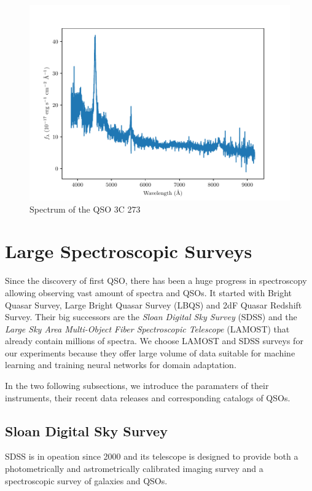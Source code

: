 \begin{figure}
\includegraphics[width=\textwidth]{img/spec_3c_273.pdf}
\caption{Spectrum of the QSO 3C 273}
\label{3c_273_spectrum}
\end{figure}

\section{Large Spectroscopic Surveys}
\label{large_spec_surveys}

Since the discovery of first QSO,
there has been a huge progress in spectroscopy allowing observing
vast amount of spectra and QSOs.
It started with Bright Quasar Survey, Large Bright Quasar Survey (LBQS)
and 2dF Quasar Redshift Survey.
Their big successors are the \textit{Sloan Digital Sky Survey} (SDSS)
and the \textit{Large Sky Area Multi-Object Fiber Spectroscopic Telescope} (LAMOST)
that already contain millions of spectra.
We choose LAMOST and SDSS surveys for our experiments
because they offer large volume of data suitable for machine learning
and training neural networks for domain adaptation.

In the two following subsections,
we introduce the paramaters of their instruments,
their recent data releases and corresponding catalogs of QSOs.

\subsection{Sloan Digital Sky Survey}
\label{sdss}

SDSS is in opeation since 2000
and its telescope is designed to provide both a photometrically
and astrometrically calibrated imaging survey
and a spectroscopic survey of galaxies and QSOs.~\cite{york2000}

